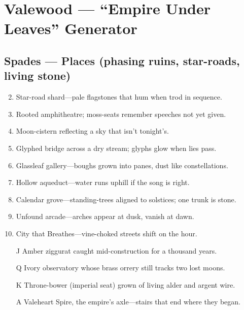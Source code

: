 \chapter{Valewood --- ``Empire Under Leaves'' Generator}

\section*{Spades --- Places (phasing ruins, star-roads, living stone)}
\begin{enumerate}
\setcounter{enumi}{1}
\item Star-road shard---pale flagstones that hum when trod in sequence.
\item Rooted amphitheatre; moss-seats remember speeches not yet given.
\item Moon-cistern reflecting a sky that isn't tonight's.
\item Glyphed bridge across a dry stream; glyphs glow when lies pass.
\item Glassleaf gallery---boughs grown into panes, dust like constellations.
\item Hollow aqueduct---water runs uphill if the song is right.
\item Calendar grove---standing-trees aligned to solstices; one trunk is stone.
\item Unfound arcade---arches appear at dusk, vanish at dawn.
\item City that Breathes---vine-choked streets shift on the hour.
\item[J] Amber ziggurat caught mid-construction for a thousand years.
\item[Q] Ivory observatory whose brass orrery still tracks two lost moons.
\item[K] Throne-bower (imperial seat) grown of living alder and argent wire.
\item[A] Valeheart Spire, the empire's axle---stairs that end where they began.
\end{enumerate}

